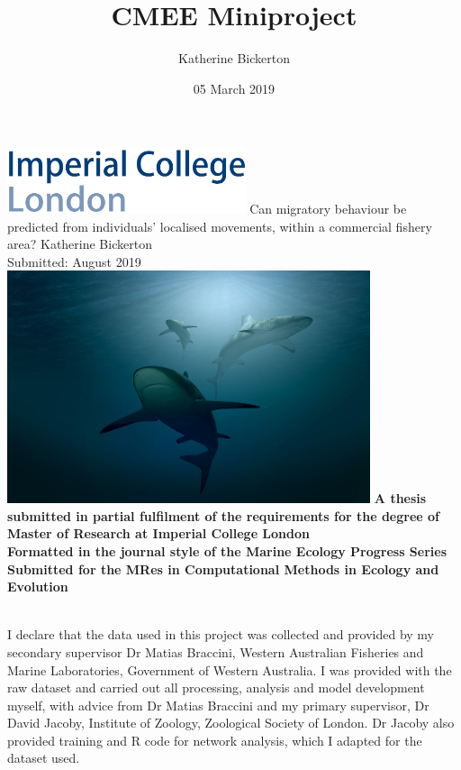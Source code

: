\documentclass[11pt,a4paper]{article}
\title{CMEE Miniproject}
\date{05 March 2019}
\author{Katherine Bickerton}
\begin{document}
	
	\begin{titlepage}
		\centering
		\includegraphics[width = 7cm,left]{../Data/imperial_logo.png}
		{\Large
			\vskip2cm
			Can migratory behaviour be predicted from individuals' localised movements, within a commercial fishery area?
		}    
		\vskip1cm	
		{\large Katherine Bickerton\\
		Submitted: August 2019}
		\vskip2cm	
		\includegraphics[width = 0.8\textwidth]{../Data/cover_image.jpg}
		\vskip3cm		
		\textbf{A thesis submitted in partial fulfilment of the requirements for the degree of Master of Research at Imperial College London\\
		Formatted in the journal style of the Marine Ecology Progress Series\\
		Submitted for the MRes in Computational Methods in Ecology and Evolution\\}
		\vspace*{\fill}
		\vspace*{\fill}
	\end{titlepage}
	
	
	\newpage
	
	\\
	
	\noindent
	I declare that the data used in this project was collected and provided by my secondary supervisor Dr Matias Braccini, Western Australian Fisheries and Marine Laboratories, Government of Western Australia. I was provided with the raw dataset and carried out all processing, analysis and model development myself, with advice from Dr Matias Braccini and my primary supervisor, Dr David Jacoby, Institute of Zoology, Zoological Society of London. Dr Jacoby also provided training and R code for network analysis, which I adapted for the dataset used.
	
\end{document}
